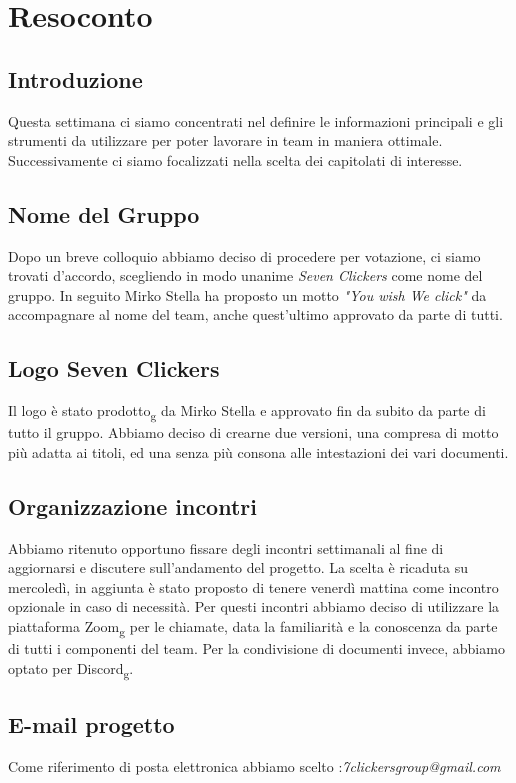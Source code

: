 \section{Resoconto}
\subsection{Introduzione}
Questa settimana ci siamo concentrati nel definire le informazioni principali e gli strumenti da utilizzare per poter lavorare in team in maniera ottimale. Successivamente ci siamo focalizzati nella scelta dei capitolati di interesse. 

\subsection{Nome del Gruppo}
Dopo un breve colloquio abbiamo deciso di procedere per votazione, ci siamo trovati d'accordo, scegliendo in modo unanime \textit{Seven Clickers} come nome del gruppo.  In seguito Mirko Stella ha proposto un motto \textit{"You wish We click"} da accompagnare al nome del team, anche quest'ultimo approvato da parte di tutti.

\subsection{Logo Seven Clickers}
Il logo è stato prodotto\textsubscript{g} da Mirko Stella e approvato fin da subito da parte di tutto il gruppo.  Abbiamo deciso di crearne due versioni, una compresa di motto più adatta ai titoli, ed una senza più consona alle intestazioni dei vari documenti. 

\subsection{Organizzazione incontri}
Abbiamo ritenuto opportuno fissare degli incontri settimanali al fine di aggiornarsi e discutere sull'andamento del progetto. La scelta è ricaduta su mercoledì,  in aggiunta è stato proposto di tenere venerdì mattina come incontro opzionale in caso di necessità.  Per questi incontri abbiamo deciso di utilizzare la piattaforma Zoom\textsubscript{g} per le chiamate, data la familiarità e la conoscenza da parte di tutti i componenti del team.  Per la condivisione di documenti invece,  abbiamo optato per Discord\textsubscript{g}.

\subsection{E-mail progetto}
Come riferimento di posta elettronica abbiamo scelto :\textit{7clickersgroup@gmail.com}

